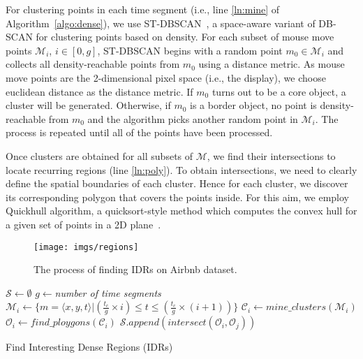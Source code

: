 \documentclass[sigconf,edbt]{acmart-edbt2019}
\begin{document}
\vspace{2pt}
For clustering points in each time segment (i.e., line \ref{ln:mine} of Algorithm~\ref{algo:dense}), we use ST-DBSCAN~\cite{Birant:2007}, a space-aware variant of DB-SCAN for clustering points based on density. For each subset of mouse move points $\mathcal{M}_i$, $i \in [0,g]$, ST-DBSCAN begins with a random point $m_0 \in \mathcal{M}_i$ and collects all density-reachable points from $m_0$ using a distance metric. As mouse move points are the 2-dimensional pixel space (i.e., the display), we choose euclidean distance as the distance metric. If $m_0$ turns out to be a core object, a cluster will be generated. Otherwise, if $m_0$ is a border object, no point is density-reachable from $m_0$ and the algorithm picks another random point in $\mathcal{M}_i$. The process is repeated until all of the points have been processed.

\vspace{2pt}
Once clusters are obtained for all subsets of $\mathcal{M}$, we find their intersections to locate recurring regions (line \ref{ln:poly}). To obtain intersections, we need to clearly define the spatial boundaries of each cluster. Hence for each cluster, we discover its corresponding polygon that covers the points inside. For this aim, we employ Quickhull algorithm, a quicksort-style method which computes the convex hull for a given set of points in a 2D plane~\cite{Barber:1996}.

\begin{figure*}[t]
\centering
   \texttt{[image: imgs/regions]}
  \caption{The process of finding IDRs on Airbnb dataset.}
  \label{fig:regions}
\end{figure*}

\begin{algorithm}[t]
\DontPrintSemicolon
{}
$\mathcal{S} \gets \emptyset$\;
$g \gets ${\em number of time segments}\;
{
       $\mathcal{M}_i \gets \{m = \langle x,y,t \rangle | (\frac{t_c}{g} \times i) \leq t \leq (\frac{t_c}{g} \times (i+1))\}$\;
       $\mathcal{C}_i \gets \mathit{mine\_clusters}(\mathcal{M}_i)$\label{ln:mine}\;
       $\mathcal{O}_i \gets \mathit{find\_ploygons}(\mathcal{C}_i)$\label{ln:poly}\;
}
{
       $\mathcal{S}.\mathit{append}(\mathit{intersect}(\mathcal{O}_i, \mathcal{O}_j))$
}
\; 
\caption{Find Interesting Dense Regions (IDRs)}
\label{algo:dense}
\end{algorithm}
\end{document}
